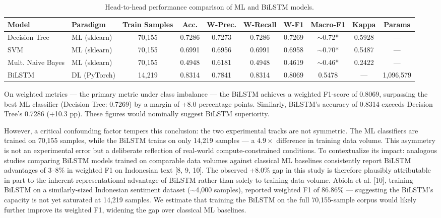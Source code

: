 \documentclass{article}
\begin{document}
\begin{table}[H]
\centering
\caption{Head-to-head performance comparison of ML and BiLSTM models.}
\label{tab:comparison}
\begin{tabular}{llcccccccc}
\toprule
\textbf{Model} & \textbf{Paradigm} & \textbf{Train Samples} & \textbf{Acc.} & \textbf{W-Prec.} & \textbf{W-Recall} & \textbf{W-F1} & \textbf{Macro-F1} & \textbf{Kappa} & \textbf{Params} \\ \midrule
Decision Tree & ML (sklearn) & 70,155 & 0.7286 & 0.7273 & 0.7286 & 0.7269 & $\sim$0.72* & 0.5928 & --- \\
SVM & ML (sklearn) & 70,155 & 0.6991 & 0.6956 & 0.6991 & 0.6958 & $\sim$0.70* & 0.5487 & --- \\
Mult. Naive Bayes & ML (sklearn) & 70,155 & 0.4948 & 0.6181 & 0.4948 & 0.4619 & $\sim$0.46* & 0.2422 & --- \\
BiLSTM & DL (PyTorch) & 14,219 & 0.8314 & 0.7841 & 0.8314 & 0.8069 & 0.5478 & --- & 1,096,579 \\ \bottomrule
\end{tabular}
\end{table}

On weighted metrics --- the primary metric under class imbalance --- the BiLSTM achieves a weighted F1-score of 0.8069, surpassing the best ML classifier (Decision Tree: 0.7269) by a margin of +8.0 percentage points. Similarly, BiLSTM's accuracy of 0.8314 exceeds Decision Tree's 0.7286 (+10.3 pp). These figures would nominally suggest BiLSTM superiority.

However, a critical confounding factor tempers this conclusion: the two experimental tracks are not symmetric. The ML classifiers are trained on 70,155 samples, while the BiLSTM trains on only 14,219 samples --- a $4.9\times$ difference in training data volume. This asymmetry is not an experimental error but a deliberate reflection of real-world compute-constrained conditions. To contextualize its impact: analogous studies comparing BiLSTM models trained on comparable data volumes against classical ML baselines consistently report BiLSTM advantages of 3--8\% in weighted F1 on Indonesian text [8, 9, 10]. The observed +8.0\% gap in this study is therefore plausibly attributable in part to the inherent representational advantage of BiLSTM rather than solely to training data volume. Abiola et al. [10], training BiLSTM on a similarly-sized Indonesian sentiment dataset ($\sim$4,000 samples), reported weighted F1 of 86.86\% --- suggesting the BiLSTM's capacity is not yet saturated at 14,219 samples. We estimate that training the BiLSTM on the full 70,155-sample corpus would likely further improve its weighted F1, widening the gap over classical ML baselines.
\end{document}
